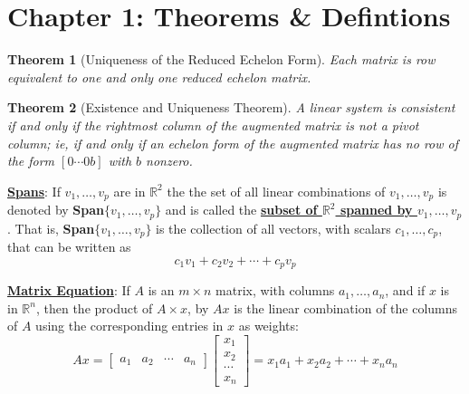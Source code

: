 \documentclass{article}
\newtheorem{theorem}{Theorem}
\newcommand{\definition}[1]{\underline{\textbf{#1}}}
\begin{document}
\section*{Chapter 1: Theorems \& Defintions}

\vspace{5mm}

\begin{theorem}[Uniqueness of the Reduced Echelon Form]
  Each matrix is row equivalent to one and only one reduced echelon matrix.
\end{theorem}

\vspace{5mm}

\begin{theorem}[Existence and Uniqueness Theorem]
  A linear system is consistent if and only if the rightmost column of the augmented matrix is \textit{not} a pivot column; ie, if and only if an echelon form of the augmented matrix has no row of the form $[0 \cdots 0 b]$ with $b$ nonzero.
\end{theorem}

\vspace{5mm}

\definition{Spans}: If $v_1, \ldots, v_p$ are in $\mathbb{R}^2$ the the set of all linear combinations of $v_1, \ldots, v_p$ is denoted by \textbf{Span}$\{v_1, \ldots, v_p\}$ and is called the \definition{subset of $\mathbb{R}^2$ spanned by $v_1, \ldots, v_p$}. That is, \textbf{Span}$\{v_1, \ldots, v_p\}$ is the collection of all vectors, with scalars $c_1, \ldots, c_p$, that can be written as
\begin{equation*}
  c_1v_1 + c_2v_2 + \cdots + c_pv_p
\end{equation*}

\vspace{5mm}

\definition{Matrix Equation}: If $A$ is an $m \times n$ matrix, with columns $a_1, \ldots, a_n$, and if $x$ is in $\mathbb{R}^n$, then the product of $A \times x$, by $Ax$ is the linear combination of the columns of $A$ using the corresponding entries in $x$ as weights:
\begin{equation*}
  Ax = \begin{bmatrix}
    a_1 & a_2 & \cdots & a_n
  \end{bmatrix}
  \begin{bmatrix}
    x_1 \\ x_2 \\ \cdots \\ x_n
  \end{bmatrix}
  = x_1a_1 + x_2a_2 + \cdots + x_na_n
\end{equation*}
\end{document}

